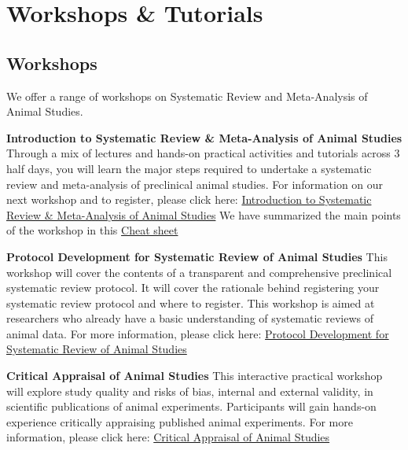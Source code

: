 \documentclass[
]{book}
\begin{document}
\chapter{Workshops \& Tutorials}\label{workshops}

\section{Workshops}\label{workshops-1}

We offer a range of workshops on Systematic Review and Meta-Analysis of Animal Studies.

\textbf{Introduction to Systematic Review \& Meta-Analysis of Animal Studies}
Through a mix of lectures and hands-on practical activities and tutorials across 3 half days, you will learn the major steps required to undertake a systematic review and meta-analysis of preclinical animal studies. For information on our next workshop and to register, please click here: \href{https://www.bihealth.org/en/translation/innovation-enabler/quest-center/events/course/introduction-to-systematic-review-meta-analysis-of-animal-studies}{Introduction to Systematic Review \& Meta-Analysis of Animal Studies}
We have summarized the main points of the workshop in this \href{CheatSheet_IntroSRworkshop_2023.pdf}{Cheat sheet}

\textbf{Protocol Development for Systematic Review of Animal Studies}
This workshop will cover the contents of a transparent and comprehensive preclinical systematic review protocol. It will cover the rationale behind registering your systematic review protocol and where to register. This workshop is aimed at researchers who already have a basic understanding of systematic reviews of animal data. For more information, please click here: \href{https://www.bihealth.org/en/translation/innovation-enabler/quest-center/events/course/protocol-development-for-systematic-review-of-animal-studies}{Protocol Development for Systematic Review of Animal Studies}

\textbf{Critical Appraisal of Animal Studies}
This interactive practical workshop will explore study quality and risks of bias, internal and external validity, in scientific publications of animal experiments. Participants will gain hands-on experience critically appraising published animal experiments. For more information, please click here: \href{https://www.bihealth.org/en/translation/innovation-enabler/quest-center/events/course/critical-appraisal-of-animal-studies-practical-workshop}{Critical Appraisal of Animal Studies}
\end{document}
